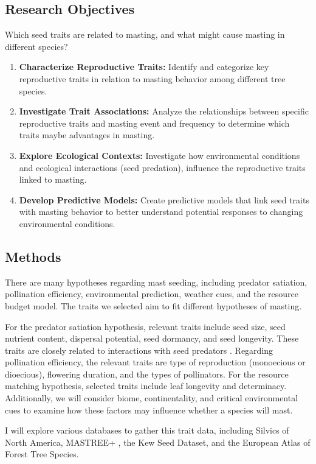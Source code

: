 \documentclass[11pt,letter]{article}
\begin{document}
\subsection{Research Objectives}
Which seed traits are related to masting, and what might cause masting in different species?
	\begin{enumerate}
	\item \textbf{Characterize Reproductive Traits:} Identify and categorize key reproductive traits in relation to masting behavior among different tree species.
	\item \textbf{Investigate Trait Associations:} Analyze the relationships between specific reproductive traits and masting event and frequency to determine which traits maybe advantages in masting.
	\item \textbf{Explore Ecological Contexts:} Investigate how environmental conditions and ecological interactions (seed predation), influence the reproductive traits linked to masting.
	\item \textbf{Develop Predictive Models:} Create predictive models that link seed traits with masting behavior to better understand potential responses to changing environmental conditions.
	\end{enumerate}
\subsection{Methods}
There are many hypotheses regarding mast seeding, including predator satiation, pollination efficiency, environmental prediction, weather cues, and the resource budget model. The traits we selected aim to fit different hypotheses of masting.

For the predator satiation hypothesis, relevant traits include seed size, seed nutrient content, dispersal potential, seed dormancy, and seed longevity. These traits are closely related to interactions with seed predators \citep{janzen1971seed}. Regarding pollination efficiency, the relevant traits are type of reproduction (monoecious or dioecious), flowering duration, and the types of pollinators. For the resource matching hypothesis, selected traits include leaf longevity and determinacy. Additionally, we will consider biome, continentality, and critical environmental cues to examine how these factors may influence whether a species will mast.

I will explore various databases to gather this trait data, including Silvics of North America, MASTREE+ \citep{hacket2022mastree+}, the Kew Seed Dataset, and the European Atlas of Forest Tree Species.
\end{document}
